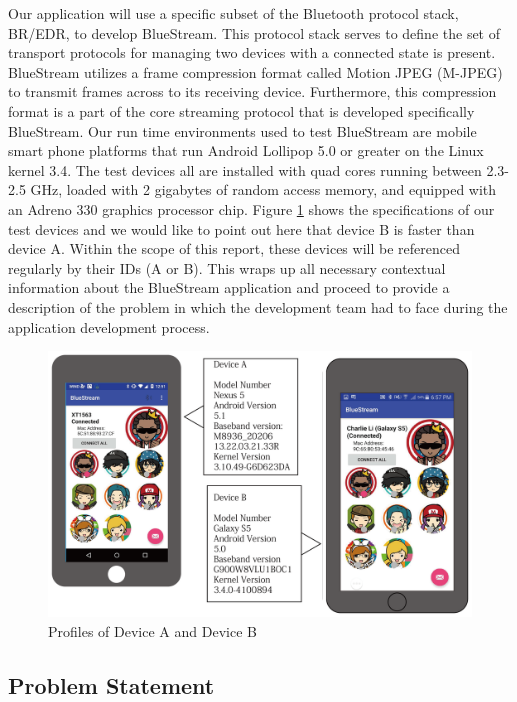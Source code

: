 \documentclass[a4paper,12pt]{article}
\begin{document}
Our application will use a specific subset of the Bluetooth protocol stack, BR/EDR, to develop BlueStream. This protocol stack serves to define the set of transport protocols for managing two devices with a connected state is present. BlueStream utilizes a frame compression format called Motion JPEG (M-JPEG) to transmit frames across to its receiving device. Furthermore, this compression format is a part of the core streaming protocol that is developed specifically BlueStream. Our run time environments used to test BlueStream are mobile smart phone platforms that run Android Lollipop 5.0 or greater on the Linux kernel 3.4. The test devices all are installed with quad cores running between 2.3-2.5 GHz, loaded with 2 gigabytes of random access memory, and equipped with an Adreno 330 graphics processor chip. Figure \ref{fig:DeviceProfiles} shows the specifications of our test devices and we would like to point out here that device B is faster than device A. Within the scope of this report, these devices will be referenced regularly by their IDs (A or B). This wraps up all necessary contextual information about the BlueStream application and proceed to provide a description of the problem in which the development team had to face during the application development process.

\begin{figure}[h!]
\centering
\includegraphics[scale=.6]{Figures/Figure1.png}
\caption{Profiles of Device A and Device B}
\label{fig:DeviceProfiles}
\end{figure}

\subsection{Problem Statement}\label{Sec:ProblemStatement}
\end{document}
